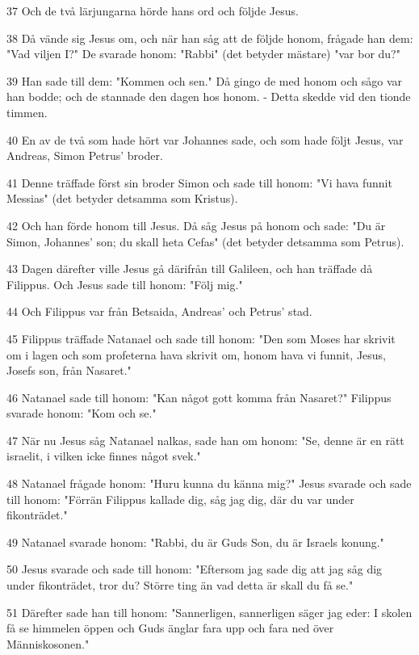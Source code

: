 \par 37 Och de två lärjungarna hörde hans ord och följde Jesus.
\par 38 Då vände sig Jesus om, och när han såg att de följde honom, frågade han dem: "Vad viljen I?" De svarade honom: "Rabbi" (det betyder mästare) "var bor du?"
\par 39 Han sade till dem: "Kommen och sen." Då gingo de med honom och sågo var han bodde; och de stannade den dagen hos honom. - Detta skedde vid den tionde timmen.
\par 40 En av de två som hade hört var Johannes sade, och som hade följt Jesus, var Andreas, Simon Petrus' broder.
\par 41 Denne träffade först sin broder Simon och sade till honom: "Vi hava funnit Messias" (det betyder detsamma som Kristus).
\par 42 Och han förde honom till Jesus. Då såg Jesus på honom och sade: "Du är Simon, Johannes' son; du skall heta Cefas" (det betyder detsamma som Petrus).
\par 43 Dagen därefter ville Jesus gå därifrån till Galileen, och han träffade då Filippus. Och Jesus sade till honom: "Följ mig."
\par 44 Och Filippus var från Betsaida, Andreas' och Petrus' stad.
\par 45 Filippus träffade Natanael och sade till honom: "Den som Moses har skrivit om i lagen och som profeterna hava skrivit om, honom hava vi funnit, Jesus, Josefs son, från Nasaret."
\par 46 Natanael sade till honom: "Kan något gott komma från Nasaret?" Filippus svarade honom: "Kom och se."
\par 47 När nu Jesus såg Natanael nalkas, sade han om honom: "Se, denne är en rätt israelit, i vilken icke finnes något svek."
\par 48 Natanael frågade honom: "Huru kunna du känna mig?" Jesus svarade och sade till honom: "Förrän Filippus kallade dig, såg jag dig, där du var under fikonträdet."
\par 49 Natanael svarade honom: "Rabbi, du är Guds Son, du är Israels konung."
\par 50 Jesus svarade och sade till honom: "Eftersom jag sade dig att jag såg dig under fikonträdet, tror du? Större ting än vad detta är skall du få se."
\par 51 Därefter sade han till honom: "Sannerligen, sannerligen säger jag eder: I skolen få se himmelen öppen och Guds änglar fara upp och fara ned över Människosonen."

